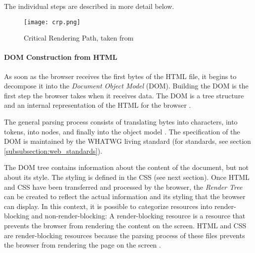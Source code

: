 The individual steps are described in more detail below.


\begin{figure}[h!]
\begin{center}
\texttt{[image: crp.png]}
\caption[Critical Rendering Path]{Critical Rendering Path, taken from \cite{2013GrigorikFluent}}
\label{img:crp}
\end{center}
\end{figure}






\paragraph{DOM Construction from HTML} %


As soon as the browser receives the first bytes of the HTML file, it begins to decompose it into the \textit{Document Object Model} (DOM).
Building the DOM is the first step the browser takes when it receives data.
The DOM is a tree structure and an internal representation of the HTML for the browser \cite{2021MDNHowBrowsersWork}.

The general parsing process consists of translating bytes into characters, into tokens, into nodes, and finally into the object model \cite{2019GrigorikDOM}.
The specification of the DOM is maintained by the WHATWG living standard (for standards, see section \ref{subsubsection:web_standards}).




The DOM tree contains information about the content of the document, but not about its style.
The styling is defined in the CSS (see next section).
Once HTML and CSS have been transferred and processed by the browser, the \textit{Render Tree} can be created to reflect the actual information and its styling that the browser can display.
In this context, it is possible to categorize resources into render-blocking and non-render-blocking:
A render-blocking resource is a resource that prevents the browser from rendering the content on the screen.
HTML and CSS are render-blocking resources because the parsing process of these files prevents the browser from rendering the page on the screen \cite{2019GrigorikCSS}.

